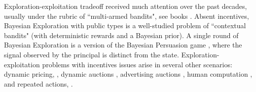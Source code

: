 {

Exploration-exploitation tradeoff received much attention over the past decades, usually under the rubric of ``multi-armed bandits", see books \cite{CesaBL-book,Bubeck-survey12,Gittins-book11}. Absent incentives, Bayesian Exploration with public types is a well-studied problem of ``contextual bandits" (with deterministic rewards and a Bayesian prior). A single round of Bayesian Exploration is a version of the Bayesian Persuasion game \cite{Kamenica-aer11}, where the signal observed by the principal is distinct from the state. Exploration-exploitation problems with incentives issues arise in several other scenarios: dynamic pricing, \eg
    \cite{KleinbergL03,BZ09,BwK-focs13},
dynamic auctions \cite{DynAuctions-survey11}, 
advertising auctions
    \cite{MechMAB-ec09,DevanurK09,Transform-ec10-jacm},
human computation
    \cite{RepeatedPA-ec14,Ghosh-itcs13,Krause-www13},
and repeated actions, \eg 
    \cite{Amin-auctions-nips13,Amin-auctions-nips14,Jieming-ec18}.
} %

